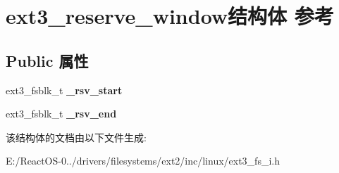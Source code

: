 \hypertarget{structext3__reserve__window}{}\section{ext3\+\_\+reserve\+\_\+window结构体 参考}
\label{structext3__reserve__window}
\subsection*{Public 属性}
\begin{DoxyCompactItemize}
\item 
\mbox{\label{structext3__reserve__window_a3f3e895736d2aecdb6f57830454ce27d}} 
ext3\+\_\+fsblk\+\_\+t {\bfseries \+\_\+rsv\+\_\+start}
\item 
\mbox{\label{structext3__reserve__window_a613b3c407e7009833d479210df0d09c4}} 
ext3\+\_\+fsblk\+\_\+t {\bfseries \+\_\+rsv\+\_\+end}
\end{DoxyCompactItemize}


该结构体的文档由以下文件生成\+:\begin{DoxyCompactItemize}
\item 
E\+:/\+React\+O\+S-\/0../drivers/filesystems/ext2/inc/linux/ext3\+\_\+fs\+\_\+i.\+h\end{DoxyCompactItemize}
